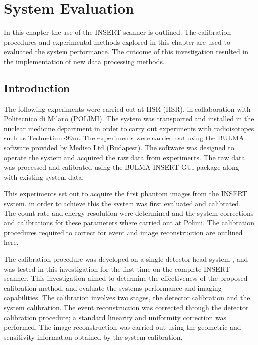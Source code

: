 \chapter{System Evaluation}
\label{Milan}



In this chapter the use of the \acrshort{INSERT} scanner is outlined. The calibration procedures and experimental methods explored in this chapter are used to evaluated the system performance. The outcome of this investigation resulted in the implementation of new data processing methods. 

\section{Introduction}
The following experiments were carried out at \acrlong{HSR} (\acrshort{HSR}), in collaboration with Politecnico di Milano (POLIMI). The system was transported and installed in the nuclear medicine department in order to carry out experiments with radioisotopes such as Technetium-99m. The experiments were carried out using the BULMA software provided by Mediso Ltd (Budapest). The software was designed to operate the system and acquired the raw data from experiments. The raw data was processed and calibrated using the BULMA INSERT-GUI package along with existing system data. 

This experiments set out to acquire the first phantom images from the \acrshort{INSERT} system, in order to achieve this the system was first evaluated and calibrated. The count-rate and energy resolution were determined and the system corrections and calibrations for these parameters where carried out at Polimi. The calibration procedures required to correct for event and image reconstruction are outlined here.

The calibration procedure was developed on a single detector head system \cite{8069508}, and was tested in this investigation for the first time on the complete \acrshort{INSERT} scanner. This investigation aimed to determine the effectiveness of the proposed calibration method, and evaluate the systems performance and imaging capabilities. The calibration involves two stages, the detector calibration and the system calibration. The event reconstruction was corrected through the detector calibration procedure; a standard linearity and uniformity correction was performed. The image reconstruction was carried out using the geometric and sensitivity information obtained by the system calibration.

